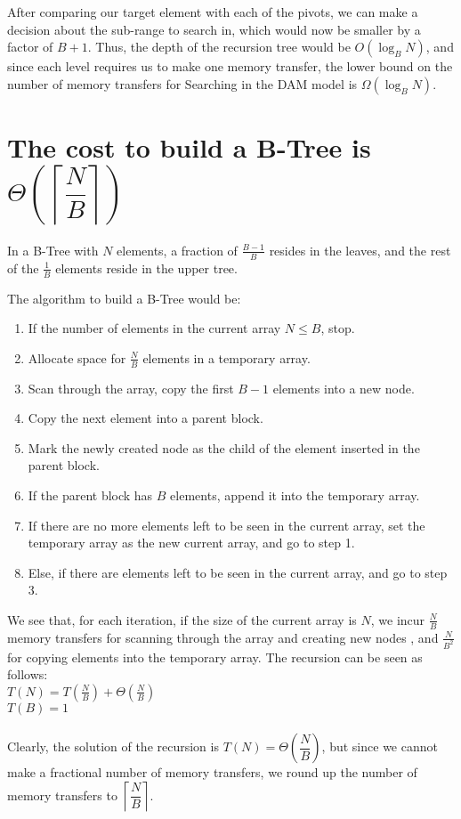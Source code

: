 \documentclass{article}
\begin{document}
After comparing our target element with each of the pivots, we can make a decision
about the sub-range to search in, which would now be smaller by a factor of $B+1$.
Thus, the depth of the recursion tree would be $O(\log_B{N})$, and since each level
requires us to make one memory transfer, the lower bound on the number of memory
transfers for Searching in the DAM model is $\Omega(\log_B{N})$.

\clearpage

\section {The cost to build a B-Tree is $\Theta\left(\left\lceil\dfrac{N}{B}\right\rceil\right)$}
In a B-Tree with $N$ elements, a fraction of $\frac{B-1}{B}$ resides in the leaves, and
the rest of the $\frac{1}{B}$ elements reside in the upper tree. 

The algorithm to build a B-Tree would be:
\begin{enumerate}
\item If the number of elements in the current array $N \leq B $, stop.
\item Allocate space for $\frac{N}{B}$ elements in a temporary array.
\item Scan through the array, copy the first $B-1$ elements into a new node.
\item Copy the next element into a parent block. 
\item Mark the newly created node as the child of the element inserted in the parent block.
\item If the parent block has $B$ elements, append it into the temporary array.
\item If there are no more elements left to be seen in the current array, set the temporary
array as the new current array, and go to step 1.
\item Else, if there are elements left to be seen in the current array, and go to step 3.
\end{enumerate}

We see that, for each iteration, if the size of the current array is $N$, we incur
$\frac{N}{B}$ memory transfers for scanning through the array and creating new nodes
, and $\frac{N}{B^2}$ for copying elements into the temporary array. The recursion
can be seen as follows:\\

$T(N) = T(\frac{N}{B}) + \Theta(\frac{N}{B})$ \\
$T(B) = 1$\\
\\
Clearly, the solution of the recursion is $T(N) = \Theta\left(\dfrac{N}{B}\right)$, but since we cannot
make a fractional number of memory transfers, we round up the number of memory transfers
to $\left\lceil \dfrac{N}{B} \right\rceil$.
\end{document}
